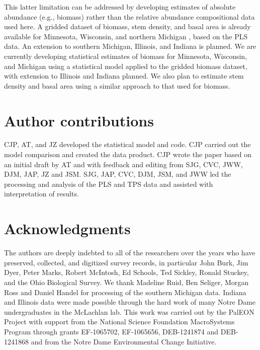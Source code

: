 \documentclass[12pt]{article}
\begin{document}
This latter limitation can be addressed by developing estimates of
absolute abundance (e.g., biomass) rather than the relative abundance
compositional data used here. A gridded dataset of biomass, stem density,
and basal area is already available for Minnesota, Wisconsin, and
northern Michigan \citep{goring2015composition}, based on the PLS
data. An extension to southern Michigan, Illinois, and Indiana is
planned. We are currently developing statistical estimates of biomass
for Minnesota, Wisconsin, and Michigan using a statistical model applied
to the gridded biomass dataset, with extension to Illinois and Indiana
planned. We also plan to estimate stem density and basal area using
a similar approach to that used for biomass. 




\section*{Author contributions}

CJP, AT, and JZ developed the statistical model and code. CJP carried
out the model comparison and created the data product. CJP wrote the
paper based on an initial draft by AT and with feedback and editing
from SJG, CVC, JWW, DJM, JAP, JZ and JSM. SJG, JAP, CVC, DJM, JSM,
and JWW led the processing and analysis of the PLS and TPS data and
assisted with interpretation of results. 


\section*{Acknowledgments}

The authors are deeply indebted to all of the researchers over the
years who have preserved, collected, and digitized survey records,
in particular John Burk, Jim Dyer, Peter Marks, Robert McIntosh, Ed
Schools, Ted Sickley, Ronald Stuckey, and the Ohio Biological Survey.
We thank Madeline Ruid, Ben Seliger, Morgan Ross and Daniel Handel
for processing of the southern Michigan data. Indiana and Illinois
data were made possible through the hard work of many Notre Dame undergraduates
in the McLachlan lab. This work was carried out by the PalEON Project
with support from the National Science Foundation MacroSystems Program
through grants EF-1065702, EF-1065656, DEB-1241874 and DEB-1241868
and from the Notre Dame Environmental Change Initiative. 


\end{document}
